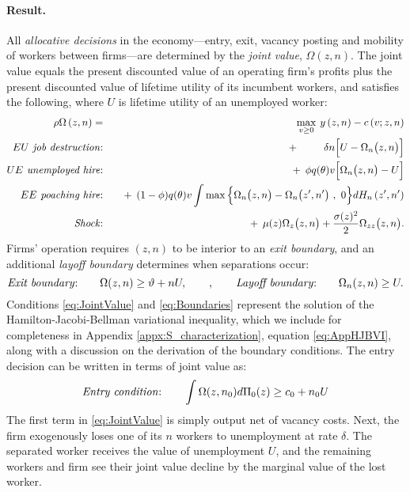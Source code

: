 \paragraph{Result.}
All \emph{allocative decisions} in the economy---entry, exit, vacancy posting and mobility of workers between firms---are determined by the \emph{joint value}, $\Omega(z,n)$.
The {joint value} equals the present discounted value of an operating firm's profits plus the present discounted value of lifetime utility of its incumbent workers, and satisfies the following, where $U$ is lifetime utility of an unemployed worker:
\vspace{-.2cm}\begin{eqnarray}  \label{eq:JointValue}
\rho \Omega\left(z,n\right) = && \max_{v \geq 0}\:y\left(z,n\right) -c\left(
v;z,n\right) \\
\text{\emph{$EU$ job destruction}:} &&\quad +\:\:\:\:\:\:\:\:\:\:\:\,\delta n \Big[U-\Omega_n\big(z,n\big)\Big]  \notag \\
\text{\emph{$UE$ unemployed hire}:} &&\quad +\:\:\phi q(\theta)v \Big[\Omega_n\big(z,n\big) -U \Big]  \notag
\\
\text{\emph{$EE$ poaching hire}:} &&\quad +\:\:(1-\phi)q(\theta) v \int \max\Big\{\Omega_n\big(z,n\big) -
\Omega_n\big(z^{\prime},n^{\prime}\big) \ , \ 0 \Big\}d{H_n}\left( z^{\prime
},n^{\prime}\right)  \notag \\
\text{\emph{Shock}:} &&\quad +\:\:\mu(z) \Omega_z\big(z,n\big) + \frac{\sigma(z)^2}{2}
\Omega_{zz}\big(z,n\big).  \notag
\vspace{-.3cm}\end{eqnarray}
Firms' operation requires $(z,n)$ to be interior to an \emph{exit boundary}, and an additional \emph{layoff boundary} determines when separations occur:
\vspace{-.2cm}\begin{equation}\label{eq:Boundaries}
\text{\emph{Exit boundary}:}\quad\quad\Omega(z,n) \geq \vartheta + n U,
\quad\quad,\quad  \quad
\text{\emph{Layoff boundary}:}\quad\quad \Omega_n(z,n) \geq U.
\vspace{-.2cm}\end{equation}
Conditions \eqref{eq:JointValue} and \eqref{eq:Boundaries} represent the solution of the Hamilton-Jacobi-Bellman variational inequality, which we include for completeness in Appendix \ref{appx:S_characterization}, equation \eqref{eq:AppHJBVI}, along with a discussion on the derivation of the boundary conditions.
The entry decision can be written in terms of joint value as:
\begin{equation}\label{eq:EntryDecision}
\text{\emph{Entry condition}:}\quad\quad \int\Omega(z,n_0)d\Pi_0(z) \geq c_0 + { n_0U}
\end{equation}
The first term in \eqref{eq:JointValue} is simply output net of vacancy costs.
Next, the firm exogenously loses one of its $n$ workers to unemployment at rate $\delta$.
The separated worker receives the value of unemployment $U$, and the remaining workers and firm see their joint value decline by the marginal value of the lost worker.

